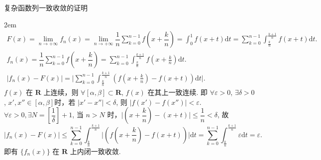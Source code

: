 \documentclass[UTF8,14pt,normal]{ctexart}
\begin{document}
 复杂函数列一致收敛的证明

    \hangindent 2em
    \noindent
    \begin{gather*}
        F(x) = \lim_{n \to +\infty} f_n(x) = \lim_{n \to +\infty} \dfrac{1}{n} \sum_{k = 0}^{n - 1} f(x + \dfrac{k}{n}) = \int_{0}^{1} f(x + t) \mathrm{d} t = \sum_{k = 0}^{n - 1} \int_{\frac{k}{n}}^{\frac{k + 1}{n}} f(x + t) \mathrm{d} t.\\
        f_n(x) = \dfrac{1}{n} \sum_{k = 0}^{n - 1} f(x + \dfrac{k}{n}) = \sum_{k = 0}^{n - 1} \int_{\frac{k}{n}}^{\frac{k + 1}{n}} f(x + \frac{k}{n}) \mathrm{d} t. \\
        \lvert f_n(x) - F(x) \rvert = \lvert \sum_{k = 0}^{n - 1} \int_{\frac{k}{n}}^{\frac{k + 1}{n}} (f(x + \frac{k}{n}) - f(x + t)) \mathrm{d} t \rvert.
    \end{gather*}
    \(f(x)\) 在 \(\mathbf{R}\) 上连续，则 \(\forall [\alpha, \beta] \subset \mathbf{R}\), \(f(x)\) 在其上一致连续. 即 \(\forall \varepsilon > 0\), \(\exists \delta > 0\), \(x', x'' \in [\alpha, \beta]\)时，若 \(\lvert x' - x'' \rvert < \delta\), 则 \(\lvert f(x') - f(x'') \rvert < \varepsilon\). \\
    \(\forall \varepsilon > 0, \exists N = \left[ \dfrac{1}{\delta} \right] + 1\), 当 \(n > N\) 时，\(\lvert (x + \dfrac{k}{n}) - (x + t) \rvert \leqslant \dfrac{1}{n} < \delta\), 故 \[
        \lvert f_n(x) - F(x) \rvert \leqslant \sum_{k = 0}^{n - 1} \int_{\frac{k}{n}}^{\frac{k + 1}{n}} \lvert (f(x + \frac{k}{n}) - f(x + t)) \rvert \mathrm{d} t = \sum_{k = 0}^{n - 1} \int_{\frac{k}{n}}^{\frac{k + 1}{n}} \varepsilon \mathrm{d} t = \varepsilon.
    \] 
    即有 \(\{f_n(x)\}\) 在 \(\mathbf{R}\) 上内闭一致收敛. 
\end{document}
